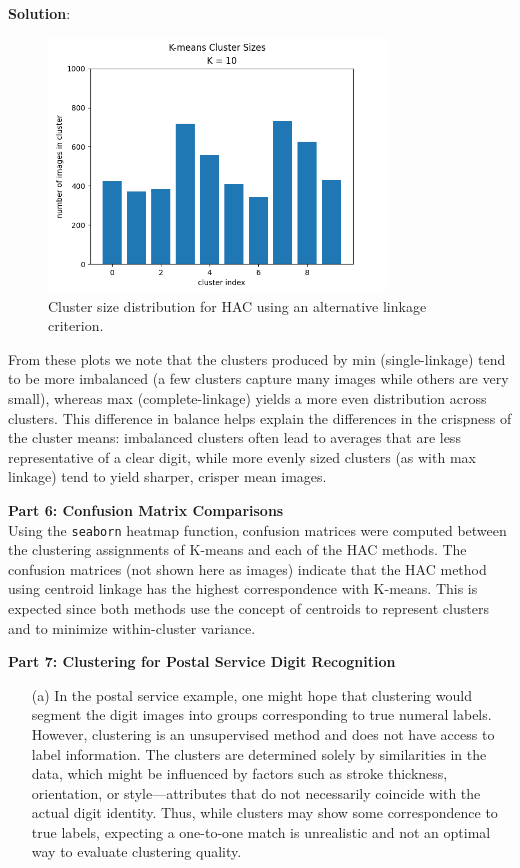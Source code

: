 \documentclass[submit]{../harvardml}
\newenvironment{solution}{
    \vspace{2mm}
    \color{blue}\noindent\textbf{Solution}:
}{}
\begin{document}
\begin{solution}
\begin{figure}[h!]
  \centering
  \includegraphics[width=0.8\textwidth]{img_output/p2.5b.png}
  \caption{Cluster size distribution for HAC using an alternative linkage criterion.}
  \label{fig:p2_5b}
\end{figure}

From these plots we note that the clusters produced by min (single-linkage) tend to be more imbalanced (a few clusters capture many images while others are very small), whereas max (complete-linkage) yields a more even distribution across clusters. This difference in balance helps explain the differences in the crispness of the cluster means: imbalanced clusters often lead to averages that are less representative of a clear digit, while more evenly sized clusters (as with max linkage) tend to yield sharper, crisper mean images.

\medskip
\textbf{Part 6: Confusion Matrix Comparisons}\\
Using the \texttt{seaborn} heatmap function, confusion matrices were computed between the clustering assignments of K-means and each of the HAC methods. The confusion matrices (not shown here as images) indicate that the HAC method using centroid linkage has the highest correspondence with K-means. This is expected since both methods use the concept of centroids to represent clusters and to minimize within-cluster variance.

\medskip
\textbf{Part 7: Clustering for Postal Service Digit Recognition}\\
\begin{enumerate}
  \item[(a)] In the postal service example, one might hope that clustering would segment the digit images into groups corresponding to true numeral labels. However, clustering is an unsupervised method and does not have access to label information. The clusters are determined solely by similarities in the data, which might be influenced by factors such as stroke thickness, orientation, or style—attributes that do not necessarily coincide with the actual digit identity. Thus, while clusters may show some correspondence to true labels, expecting a one-to-one match is unrealistic and not an optimal way to evaluate clustering quality.


\end{enumerate}
\end{solution}
\end{document}
